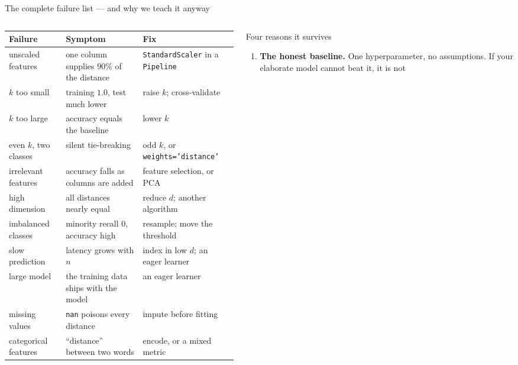 \documentclass[aspectratio=169]{beamer}
\begin{document}
\begin{frame}[shrink=9]{The complete failure list --- and why we teach it
anyway}
\begin{columns}[T]
  \begin{column}{0.60\textwidth}
    \begin{center}\tiny
    \begin{tabular}{@{}p{2.5cm}p{2.4cm}p{2.7cm}@{}}
      \toprule
      \textbf{Failure} & \textbf{Symptom} & \textbf{Fix}\\
      \midrule
      unscaled features & one column supplies $90\%$ of the distance &
        \texttt{StandardScaler} in a \texttt{Pipeline}\\
      $k$ too small & training $1.0$, test much lower & raise $k$;
        cross-validate\\
      $k$ too large & accuracy equals the baseline & lower $k$\\
      even $k$, two classes & silent tie-breaking & odd $k$, or
        \texttt{weights='distance'}\\
      irrelevant features & accuracy falls as columns are added &
        feature selection, or PCA\\
      high dimension & all distances nearly equal & reduce $d$; another
        algorithm\\
      imbalanced classes & minority recall $0$, accuracy high & resample;
        move the threshold\\
      slow prediction & latency grows with $n$ & index in low $d$; an eager
        learner\\
      large model & the training data ships with the model & an eager
        learner\\
      missing values & \texttt{nan} poisons every distance & impute before
        fitting\\
      categorical features & ``distance'' between two words & encode, or a
        mixed metric\\
      \bottomrule
    \end{tabular}
    \end{center}
  \end{column}
  \begin{column}{0.38\textwidth}
    \begin{exampleblock}{Four reasons it survives}
      \footnotesize
      \begin{enumerate}
        \item \textbf{The honest baseline.} One hyperparameter, no
          assumptions. If your elaborate model cannot beat it, it is not

\end{enumerate}
\end{exampleblock}
\end{column}
\end{columns}
\end{frame}
\end{document}
